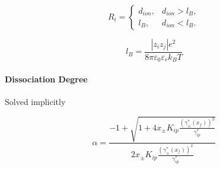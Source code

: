 \documentclass[12pt, letterpaper]{article}
\begin{document}

\begin{equation}
    R_{i}=
    \begin{cases}
        d_{ion}, & d_{ion}>l_{B}, \\
        l_{B},   & d_{ion}<l_{B}.
    \end{cases}
    \label{eq:r_ion_bjerrum}
\end{equation}


\begin{equation}
    l_{B}=\frac{\left|z_{i}z_{j}\right|e^2}{8\pi\varepsilon_{0}\varepsilon_{r}k_{B}T}
    \label{eq:bjerrum_length}
\end{equation}

\paragraph{Dissociation Degree}

Solved implicitly


\begin{equation}
    \alpha=\frac{-1+\sqrt{1+4x_{\pm} K_{ip}\frac{\left(\gamma_{\pm}^*\left(x_{f}\right)\right)^2}{\gamma_{ip}^*}}}{2x_{\pm} K_{ip}\frac{\left(\gamma_{\pm}^*\left(x_{f}\right)\right)^2}{\gamma_{ip}^*}}
    \label{eq:alpha_ion_pair}
\end{equation}

\end{document}
